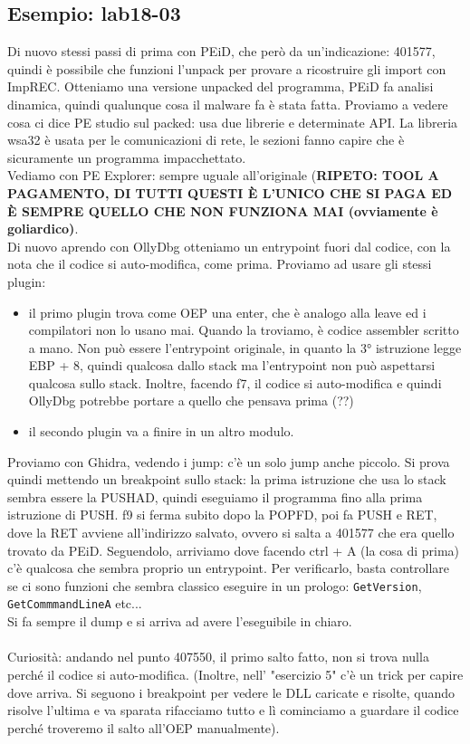 \documentclass[12pt, oneside]{extbook}
\begin{document}
\subsection{Esempio: lab18-03}
Di nuovo stessi passi di prima con PEiD, che però da un'indicazione: 401577, quindi è possibile che funzioni l'unpack per provare a ricostruire gli import con ImpREC. Otteniamo una versione unpacked del programma, PEiD fa analisi dinamica, quindi qualunque cosa il malware fa è stata fatta. Proviamo a vedere cosa ci dice PE studio sul packed: usa due librerie e determinate API. La libreria wsa32 è usata per le comunicazioni di rete, le sezioni fanno capire che è sicuramente un programma impacchettato.\\Vediamo con PE Explorer: sempre uguale all'originale (\textbf{\textsf{RIPETO: TOOL A PAGAMENTO, DI TUTTI QUESTI È L'UNICO CHE SI PAGA ED È SEMPRE QUELLO CHE NON FUNZIONA MAI (ovviamente è goliardico)}}.\\Di nuovo aprendo con OllyDbg otteniamo un entrypoint fuori dal codice, con la nota che il codice si auto-modifica, come prima. Proviamo ad usare gli stessi plugin:
\begin{itemize}
\item il primo plugin trova come OEP una enter, che è analogo alla leave ed i compilatori non lo usano mai. Quando la troviamo, è codice assembler scritto a mano. Non può essere l'entrypoint originale, in quanto la 3° istruzione legge EBP + 8, quindi qualcosa dallo stack ma l'entrypoint non può aspettarsi qualcosa sullo stack. Inoltre, facendo f7, il codice si auto-modifica e quindi OllyDbg potrebbe portare a quello che pensava prima (??)
\item il secondo plugin va a finire in un altro modulo.
\end{itemize}
Proviamo con Ghidra, vedendo i jump: c'è un solo jump anche piccolo. Si prova quindi mettendo un breakpoint sullo stack: la prima istruzione che usa lo stack sembra essere la PUSHAD, quindi eseguiamo il programma fino alla prima istruzione di PUSH. f9 si ferma subito dopo la POPFD, poi fa PUSH e RET, dove la RET avviene all'indirizzo salvato, ovvero si salta a 401577 che era quello trovato da PEiD. Seguendolo, arriviamo dove facendo ctrl + A (la cosa di prima) c'è qualcosa che sembra proprio un entrypoint. Per verificarlo, basta controllare se ci sono funzioni che sembra classico eseguire in un prologo: \texttt{GetVersion}, \texttt{GetCommmandLineA} etc...\\Si fa sempre il dump e si arriva ad avere l'eseguibile in chiaro.\\\\Curiosità: andando nel punto 407550, il primo salto fatto, non si trova nulla perché il codice si auto-modifica. (Inoltre, nell' "esercizio 5" c'è un trick per capire dove arriva. Si seguono i breakpoint per vedere le DLL caricate e risolte, quando risolve l'ultima e va sparata rifacciamo tutto e lì cominciamo a guardare il codice perché troveremo il salto all'OEP manualmente).
\end{document}
